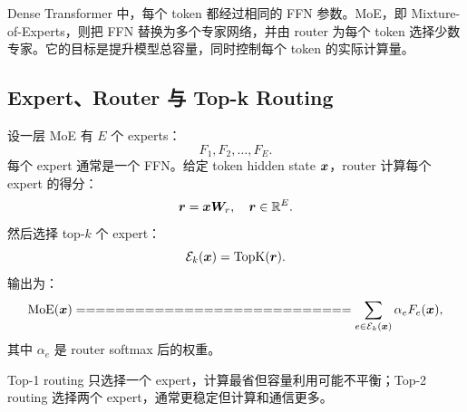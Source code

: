 Dense Transformer 中，每个 token 都经过相同的 FFN 参数。MoE，即 Mixture-of-Experts，则把 FFN 替换为多个专家网络，并由 router 为每个 token 选择少数专家。它的目标是提升模型总容量，同时控制每个 token 的实际计算量。

\subsection{Expert、Router 与 Top-k Routing}
\label{subsec:expert-router-topk}

设一层 MoE 有 $E$ 个 experts：
\[
{F_1,F_2,\ldots,F_E}.
\]
每个 expert 通常是一个 FFN。给定 token hidden state $\bm{x}$，router 计算每个 expert 的得分：
\[
\bm{r}=\bm{x}\bm{W}_r,
\quad
\bm{r}\in\mathbb{R}^{E}.
\]
然后选择 top-$k$ 个 expert：
\[
\mathcal{E}_k(\bm{x})=\operatorname{TopK}(\bm{r}).
\]
输出为：
\[
\operatorname{MoE}(\vect{x})
============================

\sum_{e\in \mathcal{E}_k(\vect{x})}
\alpha_e F_e(\vect{x}),
\]
其中 $\alpha_e$ 是 router softmax 后的权重。

Top-1 routing 只选择一个 expert，计算最省但容量利用可能不平衡；Top-2 routing 选择两个 expert，通常更稳定但计算和通信更多。

